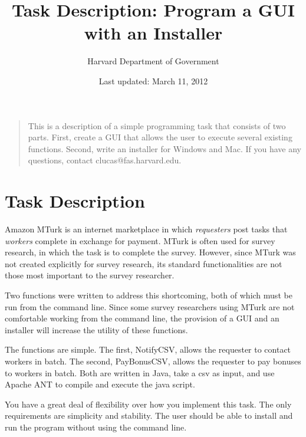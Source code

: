 \documentclass[10pt]{article}
\title{Task Description: Program a GUI with an Installer}
\author{Harvard Department of Government}
\date{Last updated: March 11, 2012}
\begin{document}
\maketitle
\begin{quotation}
This is a description of a simple programming task that consists of two parts. First, create a GUI that allows the user to execute several existing functions. Second, write an installer for Windows and Mac. If you have any questions, contact clucas@fas.harvard.edu.
\end{quotation}
\section*{Task Description}
Amazon MTurk is an internet marketplace in which \emph{requesters} post tasks that \emph{workers} complete in exchange for payment. MTurk is often used for survey research, in which the task is to complete the survey. However, since MTurk was not created explicitly for survey research, its standard functionalities are not those most important to the survey researcher. 

Two functions were written to address this shortcoming, both of which must be run from the command line. Since some survey researchers using MTurk are not comfortable working from the command line, the provision of a GUI and an installer will increase the utility of these functions. 

The functions are simple. The first, NotifyCSV, allows the requester to contact workers in batch. The second, PayBonusCSV, allows the requester to pay bonuses to workers in batch. Both are written in Java, take a csv as input, and use Apache ANT to compile and execute the java script.

You have a great deal of flexibility over how you implement this task. The only requirements are simplicity and stability. The user should be able to install and run the program without using the command line. 
\end{document}
